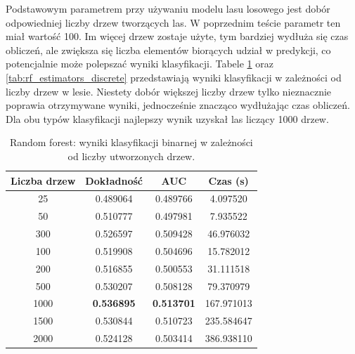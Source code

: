 \documentclass[a4paper, twoside, 11pt, openright]{article}
\begin{document}
Podstawowym parametrem przy używaniu modelu lasu losowego jest dobór odpowiedniej liczby drzew tworzących las. W poprzednim teście parametr ten miał wartość 100. Im więcej drzew zostaje użyte, tym bardziej wydłuża się czas obliczeń, ale zwiększa się liczba elementów biorących udział w predykcji, co potencjalnie może polepszać wyniki klasyfikacji. Tabele \ref{tab:rf_estimators_binary} oraz \ref{tab:rf_estimators_discrete} przedstawiają wyniki klasyfikacji w zależności od liczby drzew w lesie. Niestety dobór większej liczby drzew tylko nieznacznie poprawia otrzymywane wyniki, jednocześnie znacząco wydłużając czas obliczeń. Dla obu typów klasyfikacji najlepszy wynik uzyskał las liczący 1000 drzew.

\begin{table}[H]
    \centering
    \begin{tabular}{|c|c|c|c|}
    \hline
        \textbf{Liczba drzew} & \textbf{Dokładność} & \textbf{AUC} & \textbf{Czas (s)} \\ \hline
25         &  0.489064 &  0.489766 &    4.097520 \\ \hline
50         &  0.510777 &  0.497981 &    7.935522 \\ \hline
300        &  0.526597 &  0.509428 &   46.976032 \\ \hline
100        &  0.519908 &  0.504696 &   15.782012 \\ \hline
200        &  0.516855 &  0.500553 &   31.111518 \\ \hline
500        &  0.530207 &  0.508128 &   79.370979 \\ \hline
1000       &  \textbf{0.536895} &  \textbf{0.513701} &  167.971013 \\ \hline
1500       &  0.530844 &  0.510723 &  235.584647 \\ \hline
2000       &  0.524128 &  0.503414 &  386.938110 \\ \hline
    \end{tabular}
    \caption{Random forest: wyniki klasyfikacji binarnej w zależności od liczby utworzonych drzew.}
    \label{tab:rf_estimators_binary}
\end{table}
\end{document}
